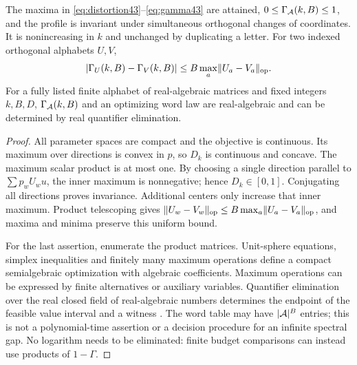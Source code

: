 \begin{proposition}\label{prop:finite-profile}
The maxima in \eqref{eq:distortion43}--\eqref{eq:gamma43} are attained, $0\le\Gamma_{\mathcal A}(k,B)\le1$, and the profile is invariant under simultaneous orthogonal changes of coordinates. It is nonincreasing in $k$ and unchanged by duplicating a letter. For two indexed orthogonal alphabets $U,V$,
\begin{equation}\label{eq:profile-stability}
 |\Gamma_U(k,B)-\Gamma_V(k,B)|
             \le B\max_{a}\lVert U_a-V_a\rVert_{\mathrm{op}}.
\end{equation}
For a fully listed finite alphabet of real-algebraic matrices and fixed integers $k,B,D$, $\Gamma_{\mathcal A}(k,B)$ and an optimizing word law are real-algebraic and can be determined by real quantifier elimination.
\end{proposition}
\begin{proof}
All parameter spaces are compact and the objective is continuous. Its maximum over directions is convex in $p$, so $D_k$ is continuous and concave. The maximum scalar product is at most one. By choosing a single direction parallel to $\sum p_w U_wu$, the inner maximum is nonnegative; hence $D_k\in[0,1]$. Conjugating all directions proves invariance. Additional centers only increase that inner maximum. Product telescoping gives $\lVert U_w-V_w\rVert_{\mathrm{op}}\le B\max_a\lVert U_a-V_a\rVert_{\mathrm{op}}$, and maxima and minima preserve this uniform bound.

For the last assertion, enumerate the product matrices. Unit-sphere equations, simplex inequalities and finitely many maximum operations define a compact semialgebraic optimization with algebraic coefficients. Maximum operations can be expressed by finite alternatives or auxiliary variables. Quantifier elimination over the real closed field of real-algebraic numbers determines the endpoint of the feasible value interval and a witness \cite{BPR}. The word table may have $|\mathcal A|^B$ entries; this is not a polynomial-time assertion or a decision procedure for an infinite spectral gap. No logarithm needs to be eliminated: finite budget comparisons can instead use products of $1-\Gamma$.
\end{proof}

